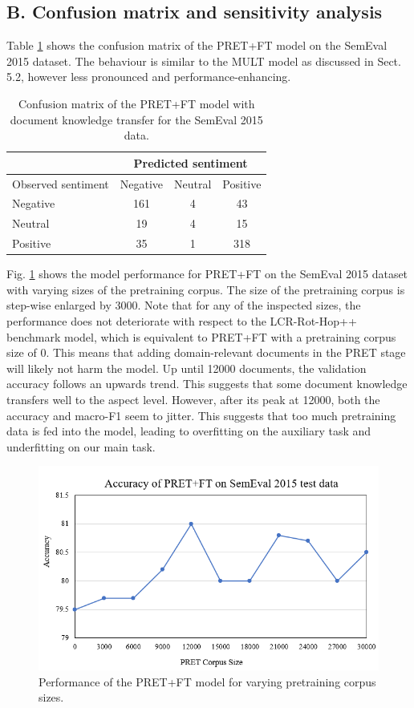 \documentclass[runningheads]{llncs}
\begin{document}
\subsection*{B. Confusion matrix and sensitivity analysis}
\renewcommand{\thefigure}{B\arabic{figure}}
\setcounter{figure}{0}
\renewcommand{\thetable}{B\arabic{table}}
\setcounter{table}{0}

Table \ref{tab:confusion matrix:pret} shows the confusion matrix of the PRET+FT model on the SemEval 2015 dataset. The behaviour is similar to the MULT model as discussed in Sect. 5.2, however less pronounced and performance-enhancing.
\begin{table}[h!]
\caption{Confusion matrix of the PRET+FT model with document knowledge transfer for the SemEval 2015 data.}
\label{tab:confusion matrix:pret}
\setlength{\tabcolsep}{28.3pt}
\begin{tabular}{@{}lccc@{}}
\toprule
                   & \multicolumn{3}{c}{Predicted sentiment} \\ \midrule
 Observed sentiment & Negative     & Neutral    & Positive    \\ \midrule
 Negative           & 161          & 4          & 43          \\
 Neutral            & 19           & 4          & 15          \\
 Positive           & 35           & 1          & 318         \\ \bottomrule
 \end{tabular}
 \end{table}
 
 Fig. \ref{fig:pret+ft} shows the model performance for PRET+FT on the SemEval 2015 dataset with varying sizes of the pretraining corpus. The size of the pretraining corpus is step-wise enlarged by 3000. Note that for any of the inspected sizes, the performance does not deteriorate with respect to the LCR-Rot-Hop++ benchmark model, which is equivalent to PRET+FT with a pretraining corpus size of 0. This means that adding domain-relevant documents in the PRET stage will likely not harm the model. Up until 12000 documents, the validation accuracy follows an upwards trend. This suggests that some document knowledge transfers well to the aspect level. However, after its peak at 12000, both the accuracy and macro-F1 seem to jitter. This suggests that too much pretraining data is fed into the model, leading to overfitting on the auxiliary task and underfitting on our main task.
 
 \begin{figure}[h!]
    \centering
    \includegraphics[scale =0.8]{Images/PRET+FT.PNG}
    \caption{Performance of the PRET+FT model for varying pretraining corpus sizes.}
    \label{fig:pret+ft}
\end{figure}
\end{document}
